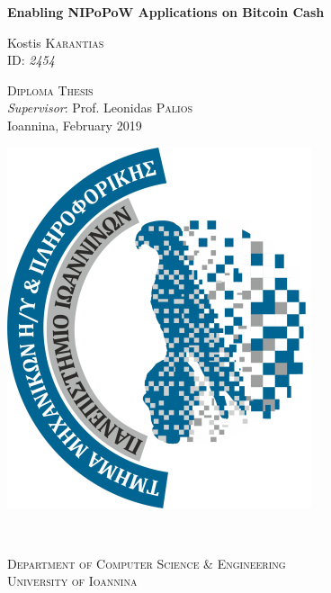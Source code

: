\begin{titlepage}
  \vspace*{\fill}
  \LARGE \textbf{Enabling NIPoPoW Applications on Bitcoin Cash} \\

  \begin{center}
    \large
    Kostis \textsc{Karantias}\\
    \small ID: \emph{2454}
  \end{center}

  \center \textsc{\Large Diploma Thesis}\\[1cm]

  \large
  \emph{Supervisor}: Prof. Leonidas \textsc{Palios}\\[1cm]

  Ioannina, February 2019
  \vspace*{\fill}

  \begin{minipage}{0.4\textwidth}
    \begin{flushleft} \large
      \includegraphics[scale=1]{cse-uoi-logo}\\
    \end{flushleft}
  \end{minipage}
    ~
  \begin{minipage}{0.5\textwidth}
    \begin{flushright}
      \textsc{\Large Department of Computer Science \& Engineering\\
      University of Ioannina}\\[0.4cm]
    \end{flushright}
  \end{minipage}\\
\end{titlepage}
